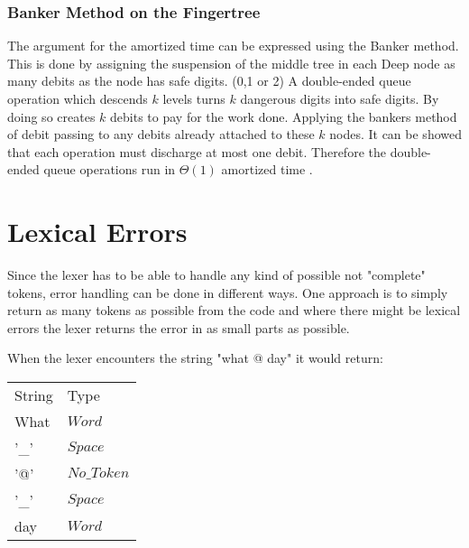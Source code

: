 \subsubsection{Banker Method on the Fingertree}
The argument for the amortized time can be expressed using the Banker method.
This is done by assigning the suspension of the middle tree in each Deep node
as many debits as the node has safe digits. (0,1 or 2) A double-ended queue
operation which descends $k$ levels turns $k$ dangerous digits into safe digits.
By doing so creates $k$ debits to pay for the work done.
Applying the bankers method of debit passing to any debits already attached to
these $k$ nodes. It can be showed that each operation must discharge at most
one debit. Therefore the double-ended queue operations run in $\Theta(1)$
amortized time \cite{fingertree}.

\section{Lexical Errors}
Since the lexer has to be able to handle any kind of possible not "complete"
tokens, error handling can be done in different ways. One approach is to simply
return as many tokens as possible from the code and where there might be lexical
errors the lexer returns the error in as small parts as possible.

\begin{example} When the lexer encounters the
string "what @ day" it would return:
\begin{center}
\begin{tabular}{ll}
String & Type\\
What & $Word$\\
'\_' & $Space$\\
'@' & $No\_Token$\\
'\_' & $Space$\\
day & $Word$\\
\end{tabular}
\end{center}
\end{example}
